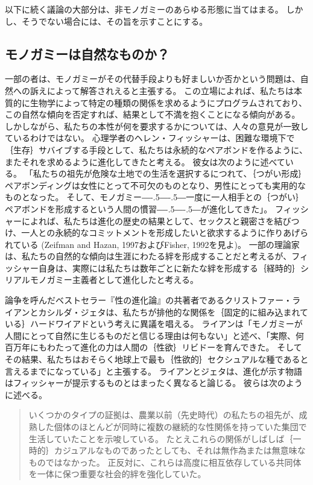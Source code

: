 \documentclass[paper=a4,book,openany]{jlreq}
\def\DDASH{―\kern-.5\zw―\kern-.5\zw―} %
\begin{document}
以下に続く議論の大部分は、非モノガミーのあらゆる形態に当てはまる。
しかし、そうでない場合には、その旨を示すことにする。

\subsection{モノガミーは自然なものか？}

一部の者は、モノガミーがその代替手段よりも好ましいか否かという問題は、自然への訴えによって解答されえると主張する。
この立場によれば、私たちは本質的に生物学によって特定の種類の関係を求めるようにプログラムされており、この自然な傾向を否定すれば、結果として不満を抱くことになる傾向がある。
しかしながら、私たちの本性が何を要求するかについては、人々の意見が一致しているわけではない。
心理学者のヘレン・フィッシャーは、困難な環境下で｛生存｝{サバイブ}する手段として、私たちは永続的なペアボンドを作るように、またそれを求めるように進化してきたと考える。
彼女は次のように述べている。
「私たちの祖先が危険な土地での生活を選択するにつれて、｛つがい形成｝{ペアボンディング}は女性にとって不可欠のものとなり、男性にとっても実用的なものとなった。
そして、モノガミー{\DDASH}一度に一人相手との｛つがい｝{ペアボンド}を形成するという人間の慣習{\DDASH}が進化してきた」\citep[p.131]{fisher04:_why_we_love}。
フィッシャーによれば、私たちは進化の歴史の結果として、セックスと親密さを結びつけ、一人との永続的なコミットメントを形成したいと欲求するように作りあげられている
(Zeifman and Hazan, 1997およびFisher, 1992を見よ)。
\nocite{zeifman97:_proces_model_adult_attac_format}\nocite{fisher92:_anatom_love}
一部の理論家は、私たちの自然的な傾向は生涯にわたる絆を形成することだと考えるが、フィッシャー自身は、実際には私たちは数年ごとに新たな絆を形成する｛経時的｝{シリアル}モノガミー主義者として進化したと考える。

論争を呼んだベストセラー『性の進化論』\citep{ryan10:_sex_dawn}の共著者であるクリストファー・ライアンとカシルダ・ジェタは、私たちが排他的な関係を｛固定的に組み込まれている｝{ハードワイアド}という考えに異議を唱える。
ライアンは「モノガミーが人間にとって自然に生じるものだと信じる理由は何もない」と述べ、「実際、何百万年にもわたって進化の力は人間の｛性欲｝{リビドー}を育んできた。
そしてその結果、私たちはおそらく地球上で最も｛性欲的｝{セクシュアル}な種であると言えるまでになっている」と主張する\citep{ryan10:_monog_unnat_our_sexy_species}。
ライアンとジェタは、進化が示す物語はフィッシャーが提示するものとはまったく異なると論じる。
彼らは次のように述べる。

\begin{quote}

いくつかのタイプの証拠は、農業以前（先史時代）の私たちの祖先が、成熟した個体のほとんどが同時に複数の継続的な性関係を持っていた集団で生活していたことを示唆している。
たとえこれらの関係がしばしば｛一時的｝{カジュアル}なものであったとしても、それは無作為または無意味なものではなかった。
正反対に、これらは高度に相互依存している共同体を一体に保つ重要な社会的絆を強化していた。
\citep[pp.9--10]{ryan10:_sex_dawn}
\end{quote}
\end{document}
